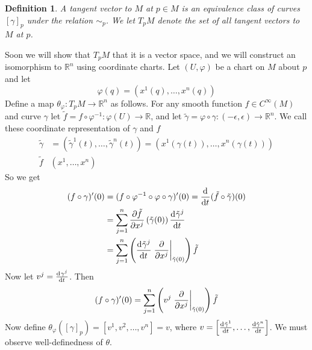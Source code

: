 \documentclass[a4paper]{article}
\newtheorem*{defn}{Definition}
\begin{document}
\begin{defn}
    A tangent vector to $M$ at $p \in M$ is an equivalence class of curves $[\gamma]_p$ under the relation $\sim_p$. We let $T_pM$ denote the set of all tangent vectors to $M$ at $p$.
\end{defn}
Soon we will show that $T_pM$ that it is a vector space, and we will construct an isomorphism to $\mathds{R}^n$ using coordinate charts. Let $(U, \varphi)$ be a chart on $M$ about $p$ and let 
\[
    \varphi(q) = (x^1(q), \dots, x^n(q))
\]
Define a map $\theta_{\varphi}: T_pM \rightarrow \mathds{R}^n$ as follows. For any smooth function $f \in C^{\infty}(M)$ and curve $\gamma$ let $\tilde{f} = f \circ \varphi^{-1}: \varphi(U) \rightarrow \mathds{R}$, and let $\tilde{\gamma} = \varphi \circ \gamma: (-\epsilon, \epsilon) \rightarrow \mathds{R}^n$. We call these coordinate representation of $\gamma$ and $f$
\[
    \begin{aligned}
      \tilde{\gamma} &= (\tilde{\gamma}^1(t), \dots, \tilde{\gamma}^n(t)) = \left( x^1(\gamma(t)), \dots, x^n(\gamma(t)) \right)\\
      \tilde{f}&(x^1, \dots, x^n)
    \end{aligned}
\]
So we get 
\[
    \begin{aligned}
      (f \circ \gamma)'(0) &= (f \circ \varphi^{-1} \circ \varphi \circ \gamma)'(0) = \dv[]{}{t}(\tilde{f} \circ \tilde{\gamma})(\tilde{f} \circ \tilde{\gamma})(0) \\
                           &= \sum_{j=1}^n \frac{\partial \tilde{f}}{\partial x^j}\left(\tilde{\gamma}(0)\right) \dv[]{\tilde{\gamma}^j}{t}(0) \\
                           &= \sum_{j=1}^n \left(\dv[]{\tilde{\gamma}^j}{t}(0) \eval{\frac{\partial}{\partial x^j}}_{\tilde{\gamma}(0)}  \right)\tilde{f} \\
    \end{aligned}
\]
Now let $v^j = \dv[]{\gamma^j}{t}(0)$. Then
\[
  (f \circ \gamma)'(0) = \sum_{j=1}^n \left(v^j \eval{\frac{\partial}{\partial x^j}}_{\tilde{\gamma}(0)}  \right)\tilde{f} \\
\]
Now define $\theta_{\varphi}([\gamma]_p) = [v^1, v^2, \dots, v^n] = v$, where $v = \left[\dv[]{\tilde{\gamma}^1}{t}(0), \dots, \dv{\tilde{\gamma}^n}{t}(0)\right]$. We must observe well-definedness of $\theta$.
\end{document}
